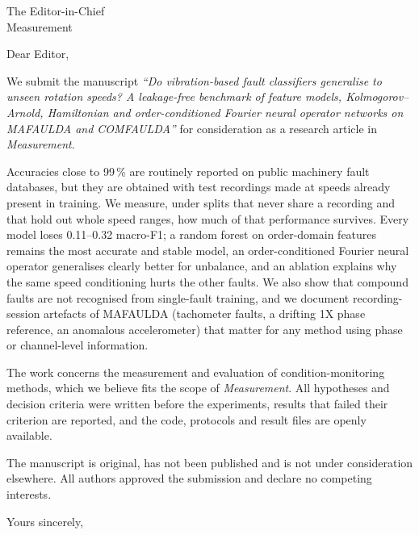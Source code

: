 \documentclass[11pt]{letter}
\begin{document}
\begin{letter}{The Editor-in-Chief\\ Measurement}
\opening{Dear Editor,}

We submit the manuscript \emph{``Do vibration-based fault classifiers generalise to unseen rotation speeds? A
leakage-free benchmark of feature models, Kolmogorov--Arnold, Hamiltonian and order-conditioned Fourier neural operator
networks on MAFAULDA and COMFAULDA''} for consideration as a research article in \emph{Measurement}.

Accuracies close to 99\,\% are routinely reported on public machinery fault databases, but they are obtained with test
recordings made at speeds already present in training. We measure, under splits that never share a recording and that
hold out whole speed ranges, how much of that performance survives. Every model loses 0.11--0.32 macro-F1; a random
forest on order-domain features remains the most accurate and stable model, an order-conditioned Fourier neural
operator generalises clearly better for unbalance, and an ablation explains why the same speed conditioning hurts the
other faults. We also show that compound faults are not recognised from single-fault training, and we document
recording-session artefacts of MAFAULDA (tachometer faults, a drifting 1X phase reference, an anomalous accelerometer)
that matter for any method using phase or channel-level information.

The work concerns the measurement and evaluation of condition-monitoring methods, which we believe fits the scope of
\emph{Measurement}. All hypotheses and decision criteria were written before the experiments, results that failed
their criterion are reported, and the code, protocols and result files are openly available.

The manuscript is original, has not been published and is not under consideration elsewhere. All authors approved the
submission and declare no competing interests.

\closing{Yours sincerely,}
\end{letter}
\end{document}
